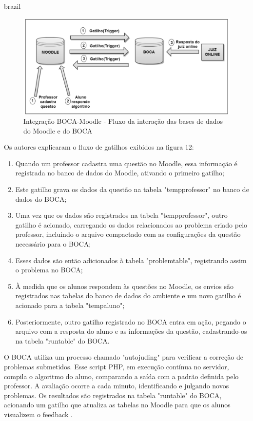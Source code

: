 \begin{otherlanguage*}{brazil}
\begin{figure}[h!]
	   \centering
            \caption{Integração BOCA-Moodle - Fluxo da interação das bases de dados do Moodle e do BOCA}
            \label{fig:ModeloConceitual}
	   	\includegraphics[scale=0.3]{pictures/BOCA_fluxo.png}
\end{figure}

Os autores explicaram o fluxo de gatilhos exibidos na figura 12:


\begin{enumerate} [label=(\alph*)]
    \item Quando um professor cadastra uma questão no Moodle, essa informação é registrada no banco de dados do Moodle, ativando o primeiro gatilho;
    \item Este gatilho grava os dados da questão na tabela "tempprofessor" no banco de dados do BOCA;
    \item Uma vez que os dados são registrados na tabela "tempprofessor", outro gatilho é acionado, carregando os dados relacionados ao problema criado pelo professor, incluindo o arquivo compactado com as configurações da questão necessário para o BOCA;
    \item Esses dados são então adicionados à tabela "problemtable", registrando assim o problema no BOCA;
    \item À medida que os alunos respondem às questões no Moodle, os envios são registrados nas tabelas do banco de dados do ambiente e um novo gatilho é acionado para a tabela "tempaluno";
    \item Posteriormente, outro gatilho registrado no BOCA entra em ação, pegando o arquivo com a resposta do aluno e as informações da questão, cadastrando-os na tabela "runtable" do BOCA.
\end{enumerate}

O BOCA utiliza um processo chamado "autojuding" para verificar a correção de problemas submetidos. Esse script PHP, em execução contínua no servidor, compila o algoritmo do aluno, comparando a saída com a padrão definida pelo professor. A avaliação ocorre a cada minuto, identificando e julgando novos problemas. Os resultados são registrados na tabela "runtable" do BOCA, acionando um gatilho que atualiza as tabelas no Moodle para que os alunos visualizem o feedback  \cite[p.~29]{galasso}.


\end{otherlanguage*}
